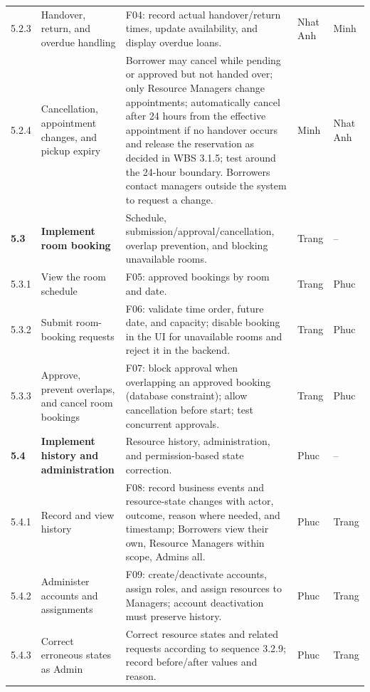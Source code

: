 \documentclass[11pt]{article}
\renewcommand{\arraystretch}{1.18}
\begin{document}
\begin{longtable}{@{}L{1.15cm}L{3.2cm}L{7.6cm}L{1.4cm}L{1.4cm}@{}}
5.2.3 & Handover, return, and overdue handling & F04: record actual handover/return times, update availability, and display overdue loans. & Nhat Anh & Minh \\
5.2.4 & Cancellation, appointment changes, and pickup expiry & Borrower may cancel while pending or approved but not handed over; only Resource Managers change appointments; automatically cancel after 24 hours from the effective appointment if no handover occurs and release the reservation as decided in WBS 3.1.5; test around the 24-hour boundary. Borrowers contact managers outside the system to request a change. & Minh & Nhat Anh \\
\textbf{5.3} & \textbf{Implement room booking} & Schedule, submission/approval/cancellation, overlap prevention, and blocking unavailable rooms. & Trang & -- \\
5.3.1 & View the room schedule & F05: approved bookings by room and date. & Trang & Phuc \\
5.3.2 & Submit room-booking requests & F06: validate time order, future date, and capacity; disable booking in the UI for unavailable rooms and reject it in the backend. & Trang & Phuc \\
5.3.3 & Approve, prevent overlaps, and cancel room bookings & F07: block approval when overlapping an approved booking (database constraint); allow cancellation before start; test concurrent approvals. & Trang & Phuc \\
\textbf{5.4} & \textbf{Implement history and administration} & Resource history, administration, and permission-based state correction. & Phuc & -- \\
5.4.1 & Record and view history & F08: record business events and resource-state changes with actor, outcome, reason where needed, and timestamp; Borrowers view their own, Resource Managers within scope, Admins all. & Phuc & Trang \\
5.4.2 & Administer accounts and assignments & F09: create/deactivate accounts, assign roles, and assign resources to Managers; account deactivation must preserve history. & Phuc & Trang \\
5.4.3 & Correct erroneous states as Admin & Correct resource states and related requests according to sequence 3.2.9; record before/after values and reason. & Phuc & Trang \\
\bottomrule\end{longtable}\normalsize\setlength{\tabcolsep}{3pt}\renewcommand{\arraystretch}{1.18}
\end{document}
